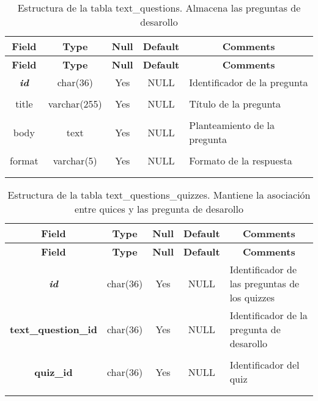 %
%
\begin{longtable}{c c c c l}
	\multicolumn{1}{c}{\textbf{Field}} &
	\multicolumn{1}{c}{\textbf{Type}} &
	\multicolumn{1}{c}{\textbf{Null}} &
	\multicolumn{1}{c}{\textbf{Default}} &
	\multicolumn{1}{c}{\textbf{Comments}} \\ \hline \hline
\endfirsthead
	\multicolumn{1}{c}{\textbf{Field}} &
	\multicolumn{1}{c}{\textbf{Type}} &
	\multicolumn{1}{c}{\textbf{Null}} &
	\multicolumn{1}{c}{\textbf{Default}} &
	\multicolumn{1}{c}{\textbf{Comments}} \\ \hline \hline
\endhead \endfoot
	\textbf{\textit{id}} & char(36) & Yes & NULL & \parbox[t]{0.35\textwidth}{Identificador de la pregunta} \\ \\ \hline
	title & varchar(255) & Yes & NULL & \parbox[t]{0.35\textwidth}{Título de la pregunta} \\ \\ \hline
	body & text & Yes & NULL  & \parbox[t]{0.35\textwidth}{Planteamiento de la pregunta} \\ \\ \hline
	format & varchar(5) & Yes & NULL  & \parbox[t]{0.35\textwidth}{Formato de la respuesta} \\ \\
\caption[Estructura de la tabla text\_questions]{Estructura de la tabla text\_questions. Almacena las preguntas de desarollo} \label{tab:quiz_text_questions-structure} \\
\end{longtable}

%
%
\begin{longtable}{c c c c l}
	\multicolumn{1}{c}{\textbf{Field}} &
	\multicolumn{1}{c}{\textbf{Type}} &
	\multicolumn{1}{c}{\textbf{Null}} &
	\multicolumn{1}{c}{\textbf{Default}} &
	\multicolumn{1}{c}{\textbf{Comments}} \\ \hline \hline
\endfirsthead
	\multicolumn{1}{c}{\textbf{Field}} &
	\multicolumn{1}{c}{\textbf{Type}} &
	\multicolumn{1}{c}{\textbf{Null}} &
	\multicolumn{1}{c}{\textbf{Default}} &
	\multicolumn{1}{c}{\textbf{Comments}} \\ \hline \hline
\endhead \endfoot
	\textbf{\textit{id}} & char(36) & Yes & NULL & \parbox[t]{0.35\textwidth}{Identificador de las preguntas de los quizzes}\\ \hline 
	\textbf{text\_question\_id} & char(36) & Yes & NULL & \parbox[t]{0.35\textwidth}{Identificador de la pregunta de desarollo} \\ \\ \hline 
	\textbf{quiz\_id} & char(36) & Yes & NULL & \parbox[t]{0.35\textwidth}{Identificador del quiz} \\ \\
\caption[Estructura de la tabla text\_questions\_quizzes]{Estructura de la tabla text\_questions\_quizzes. Mantiene la asociación entre quices y las pregunta de desarollo} \label{tab:quiz_text_questions_quizzes-structure} \\
\end{longtable}


